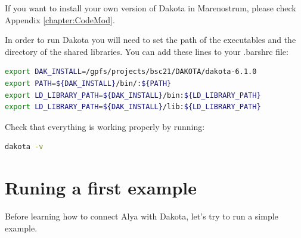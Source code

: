 \documentclass[12pt,a4paper,article]{memoir} %
\begin{document}
If you want to install your own version of Dakota in Marenostrum, please check Appendix \ref{chapter:CodeMod}.


In order to run Dakota you will need to set the path of the executables and the directory of the shared libraries. You can add these lines to your .barshrc file:

\begin{lstlisting}[style=MyCodeStyle,language=bash]
export DAK_INSTALL=/gpfs/projects/bsc21/DAKOTA/dakota-6.1.0
export PATH=${DAK_INSTALL}/bin/:${PATH}
export LD_LIBRARY_PATH=${DAK_INSTALL}/bin:${LD_LIBRARY_PATH}
export LD_LIBRARY_PATH=${DAK_INSTALL}/lib:${LD_LIBRARY_PATH}
\end{lstlisting}

Check that everything is working properly by running:

\begin{lstlisting}[style=MyCodeStyle,language=bash]
dakota -v
\end{lstlisting}

\chapter{Runing a first example}
Before learning how to connect Alya with Dakota, let's try to run a simple example.  
\end{document}
